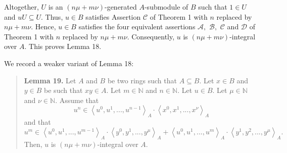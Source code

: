 \documentclass[12pt,final,notitlepage,onecolumn]{article}%
\begin{document}
Altogether, $U$ is an $\left(  n\mu+m\nu\right)  $-generated $A$-submodule of
$B$ such that $1\in U$ and $uU\subseteq U$. Thus, $u\in B$ satisfies Assertion
$\mathcal{C}$ of Theorem 1 with $n$ replaced by $n\mu+m\nu$. Hence, $u\in B$
satisfies the four equivalent assertions $\mathcal{A},$ $\mathcal{B},$
$\mathcal{C}$ and $\mathcal{D}$ of Theorem 1 with $n$ replaced by $n\mu+m\nu$.
Consequently, $u$ is $\left(  n\mu+m\nu\right)  $-integral over $A$. This
proves Lemma 18.

We record a weaker variant of Lemma 18:

\begin{quote}
\textbf{Lemma 19.} Let $A$ and $B$ be two rings such that $A\subseteq B$. Let
$x\in B$ and $y\in B$ be such that $xy\in A$. Let $m\in\mathbb{N}$ and
$n\in\mathbb{N}$. Let $u\in B$. Let $\mu\in\mathbb{N}$ and $\nu\in\mathbb{N}$.
Assume that%
\begin{equation}
u^{n}\in\left\langle u^{0},u^{1},...,u^{n-1}\right\rangle _{A}\cdot
\left\langle x^{0},x^{1},...,x^{\nu}\right\rangle _{A} \label{L19-1}%
\end{equation}
and that%
\begin{equation}
u^{m}\in\left\langle u^{0},u^{1},...,u^{m-1}\right\rangle _{A}\cdot
\left\langle y^{0},y^{1},...,y^{\mu}\right\rangle _{A}+\left\langle
u^{0},u^{1},...,u^{m}\right\rangle _{A}\cdot\left\langle y^{1},y^{2}%
,...,y^{\mu}\right\rangle _{A}. \label{L19-2}%
\end{equation}
Then, $u$ is $\left(  n\mu+m\nu\right)  $-integral over $A$.
\end{quote}
\end{document}
